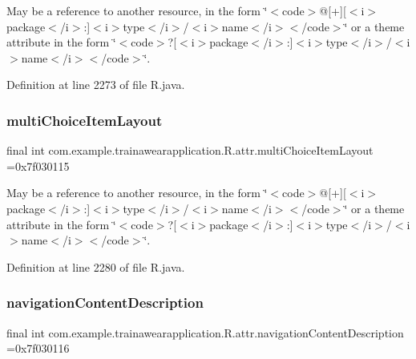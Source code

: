 May be a reference to another resource, in the form \char`\"{}$<$code$>$@\mbox{[}+\mbox{]}\mbox{[}$<$i$>$package$<$/i$>$\+:\mbox{]}$<$i$>$type$<$/i$>$/$<$i$>$name$<$/i$>$$<$/code$>$\char`\"{} or a theme attribute in the form \char`\"{}$<$code$>$?\mbox{[}$<$i$>$package$<$/i$>$\+:\mbox{]}$<$i$>$type$<$/i$>$/$<$i$>$name$<$/i$>$$<$/code$>$\char`\"{}. 

Definition at line 2273 of file R.\+java.

\mbox{\label{classcom_1_1example_1_1trainawearapplication_1_1_r_1_1attr_a91edfc3215b85f71210a803a6d8accbb}} 
\subsubsection{\texorpdfstring{multiChoiceItemLayout}{multiChoiceItemLayout}}
{\footnotesize\ttfamily final int com.\+example.\+trainawearapplication.\+R.\+attr.\+multi\+Choice\+Item\+Layout =0x7f030115\hspace{0.3cm}{\ttfamily [static]}}

May be a reference to another resource, in the form \char`\"{}$<$code$>$@\mbox{[}+\mbox{]}\mbox{[}$<$i$>$package$<$/i$>$\+:\mbox{]}$<$i$>$type$<$/i$>$/$<$i$>$name$<$/i$>$$<$/code$>$\char`\"{} or a theme attribute in the form \char`\"{}$<$code$>$?\mbox{[}$<$i$>$package$<$/i$>$\+:\mbox{]}$<$i$>$type$<$/i$>$/$<$i$>$name$<$/i$>$$<$/code$>$\char`\"{}. 

Definition at line 2280 of file R.\+java.

\mbox{\label{classcom_1_1example_1_1trainawearapplication_1_1_r_1_1attr_a05e4b01fb1ae2e7c167c60a9f1691c33}} 
\subsubsection{\texorpdfstring{navigationContentDescription}{navigationContentDescription}}
{\footnotesize\ttfamily final int com.\+example.\+trainawearapplication.\+R.\+attr.\+navigation\+Content\+Description =0x7f030116\hspace{0.3cm}{\ttfamily [static]}}

